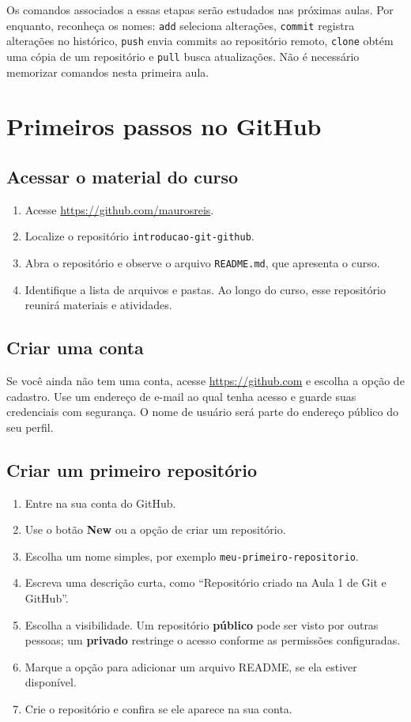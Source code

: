 \documentclass[12pt,a4paper]{article}
\begin{document}
Os comandos associados a essas etapas serão estudados nas próximas aulas. Por enquanto, reconheça os nomes: \texttt{add} seleciona alterações, \texttt{commit} registra alterações no histórico, \texttt{push} envia commits ao repositório remoto, \texttt{clone} obtém uma cópia de um repositório e \texttt{pull} busca atualizações. Não é necessário memorizar comandos nesta primeira aula.

\section{Primeiros passos no GitHub}
\subsection{Acessar o material do curso}
\begin{enumerate}
\item Acesse \url{https://github.com/maurosreis}.
\item Localize o repositório \texttt{introducao-git-github}.
\item Abra o repositório e observe o arquivo \texttt{README.md}, que apresenta o curso.
\item Identifique a lista de arquivos e pastas. Ao longo do curso, esse repositório reunirá materiais e atividades.
\end{enumerate}

\subsection{Criar uma conta}
Se você ainda não tem uma conta, acesse \url{https://github.com} e escolha a opção de cadastro. Use um endereço de e-mail ao qual tenha acesso e guarde suas credenciais com segurança. O nome de usuário será parte do endereço público do seu perfil.

\subsection{Criar um primeiro repositório}
\begin{enumerate}
\item Entre na sua conta do GitHub.
\item Use o botão \textbf{New} ou a opção de criar um repositório.
\item Escolha um nome simples, por exemplo \texttt{meu-primeiro-repositorio}.
\item Escreva uma descrição curta, como ``Repositório criado na Aula 1 de Git e GitHub''.
\item Escolha a visibilidade. Um repositório \textbf{público} pode ser visto por outras pessoas; um \textbf{privado} restringe o acesso conforme as permissões configuradas.
\item Marque a opção para adicionar um arquivo README, se ela estiver disponível.
\item Crie o repositório e confira se ele aparece na sua conta.
\end{enumerate}
\end{document}
